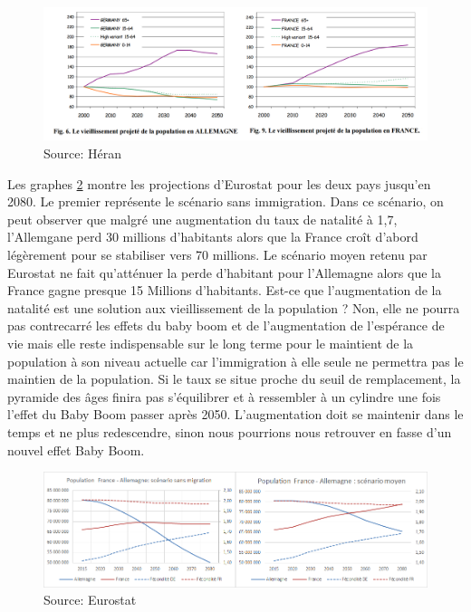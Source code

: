 \begin{figure}[h!]
    \begin{center}
        \includegraphics[scale=0.4]{document/vieillissement.png}
        \caption{Source: Héran\citep[pp.5-6]{heran}}
        \label{vieillissement}
    \end{center}
\end{figure}

Les graphes \ref{FR-DE_natalite.png} montre les projections d’Eurostat\citep{eurostat_europop13} pour les deux pays jusqu’en 2080. Le premier représente le scénario sans immigration. Dans ce scénario, on peut observer que malgré une augmentation du taux de natalité à 1,7, l’Allemgane perd 30 millions d’habitants alors que la France croît d’abord légèrement pour se stabiliser vers 70 millions. Le scénario moyen retenu par Eurostat\citep{eurostat_europop13} ne fait qu’atténuer la perde d’habitant pour l’Allemagne alors que la France gagne presque 15 Millions d’habitants. Est-ce que l’augmentation de la natalité est une solution aux vieillissement de la population ? Non, elle ne pourra pas contrecarré les effets du baby boom et de l’augmentation de l’espérance de vie mais elle reste indispensable sur le long terme pour le maintient de la population à son niveau actuelle car l’immigration à elle seule ne permettra pas le maintien de la population. Si le taux se situe proche du seuil de remplacement, la pyramide des âges finira pas s'équilibrer et à ressembler à un cylindre une fois l’effet du Baby Boom passer après 2050. L’augmentation doit se maintenir dans le temps et ne plus redescendre, sinon nous pourrions nous retrouver en fasse d’un nouvel effet Baby Boom. 

\begin{figure}[h!]
    \begin{center}
        \includegraphics[scale=0.6]{document/FR-DE_natalite.png}
        \caption{Source: Eurostat\citep{eurostat_europop13}}
        \label{FR-DE_natalite.png}
    \end{center}
\end{figure}

